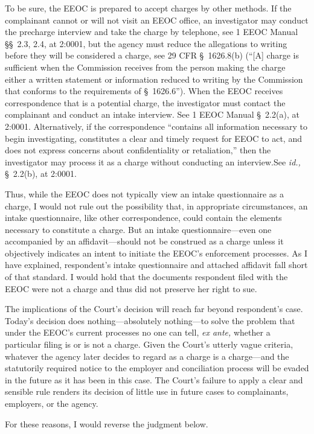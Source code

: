   To be sure, the EEOC is prepared to accept charges by other methods.
If the complainant cannot or will not visit an EEOC office, an
investigator may conduct the precharge interview and take the charge
by telephone, see 1 EEOC Manual \S\S~2.3, 2.4, at 2:0001, but
the agency must reduce the allegations to writing before they will
be considered a charge, see 29 CFR \S~1626.8(b) (``[A] charge is
sufficient when the Commission receives from the person making the
charge either a written statement or information reduced to writing by
the Commission that conforms to the requirements of \S~1626.6'').
When the EEOC receives correspondence that is a potential charge,
the investigator must contact the complainant and conduct an intake
interview. See 1 EEOC Manual \S~2.2(a), at 2:0001. Alternatively,
if the correspondence ``contains all information necessary to begin
investigating, constitutes a clear and timely request for EEOC to act,
and does not express concerns about confidentiality or retaliation,''
then the investigator may process it as a charge without conducting an
interview.See \emph{id.,} \S~2.2(b), at 2:0001.

  Thus, while the EEOC does not typically view an intake questionnaire
as a charge, I would not rule out the possibility that, in appropriate
circumstances, an intake questionnaire, like other correspondence,
could contain the elements necessary to constitute a charge. But an
intake questionnaire---even one accompanied by an affidavit---should
not be construed as a charge unless it objectively indicates an intent
to initiate the EEOC's enforcement processes. As I have explained,
respondent's intake questionnaire and attached affidavit fall short of
that standard. I would hold that the documents respondent filed with the
EEOC were not a charge and thus did not preserve her right to sue.

  The implications of the Court's decision will reach far beyond
respondent's case. Today's decision does nothing---ab\newpage solutely
nothing---to solve the problem that under the EEOC's current processes
no one can tell, \emph{ex ante,} whether a particular filing is or is not a
charge. Given the Court's utterly vague criteria, whatever the agency
later decides to regard as a charge is a charge---and the statutorily
required notice to the employer and conciliation process will be evaded
in the future as it has been in this case. The Court's failure to
apply a clear and sensible rule renders its decision of little use in
future cases to complainants, employers, or the agency.

  For these reasons, I would reverse the judgment below.
